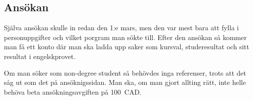 \documentclass[11pt,a4paper, english, swedish]{article}
\begin{document}
\subsection{Ansökan}
Själva ansökan skulle in redan den 1:e mars, men den var mest bara att
fylla i personuppgifter och vilket porgram man sökte till. Efter den
ansökan så kommer man få ett konto\footnotemark{} där man ska ladda
upp saker som kursval, studeresultat och sitt resultat i
engelskprovet. 


Om man söker som non-degree student så behövdes inga referenser, trots
att det såg ut som det på ansöknigssidan. Man ska, om man gjort
allting rätt, inte helle behöva beta ansökningsavgiften på 100~CAD.
\end{document}

